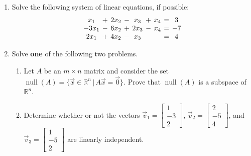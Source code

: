 \documentclass[12pt]{article}
\newcommand{\points}[1]{\marginpar{\hspace{24pt}[#1]}}
\newcommand{\R}{\mathbb{R}}
\newcommand{\bbm}{\begin{bmatrix}}
\newcommand{\ebm}{\end{bmatrix}}
\begin{document}
\begin{enumerate}
\newpage

\item Solve the following system of linear equations, if possible: \points{6}
\[\arraycolsep=2pt
 \begin{array}{ccccccccc}
  x_1&+&2x_2&-&x_3&+&x_4&=&3\\
 -3x_1&-&6x_2&+&2x_3&-&x_4&=&-7\\
 2x_1&+&4x_2&-&x_3& & &=&4
 \end{array}
\]

\newpage

\item Solve \textbf{one} of the following two problems. \points{5}
\begin{enumerate}
 \item Let $A$ be an $m\times n$ matrix and consider the set $\operatorname{null}(A) = \{\vec{x}\in \R^n \,|\, A\vec{x} = \vec{0}\}$. Prove that $\operatorname{null}(A)$ is a subspace of $\R^n$.

\item Determine whether or not the vectors $\vec{v}_1 = \bbm 1\\-3\\2\ebm$, $\vec{v}_2 = \bbm 2\\-5\\4\ebm$, and $\vec{v}_3 = \bbm 1\\-5\\2\ebm$ are linearly independent. 

\end{enumerate}


\end{enumerate}
\end{document}
